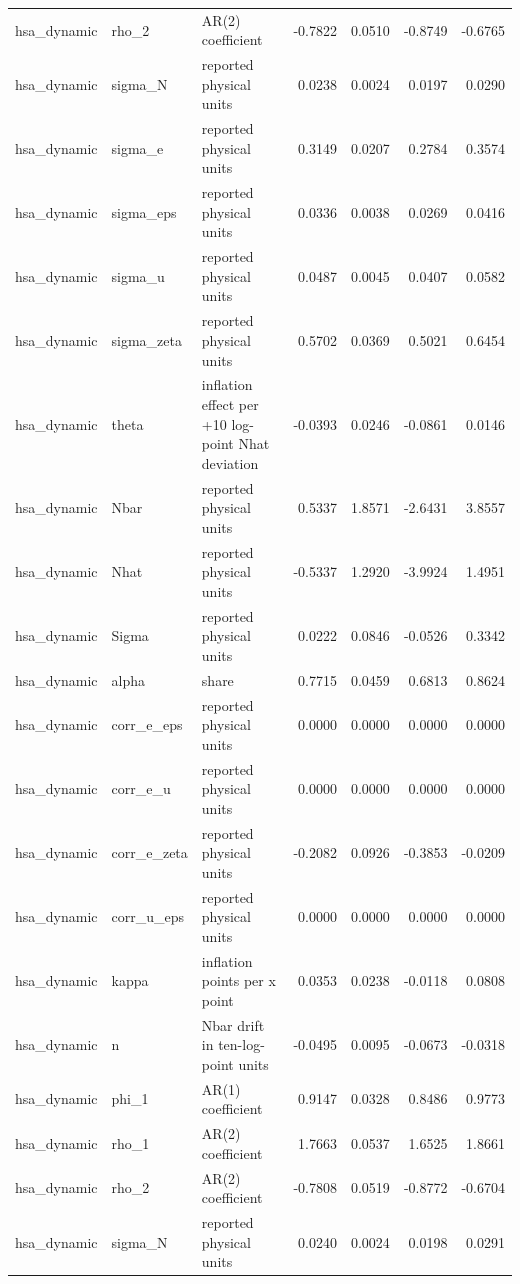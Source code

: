 \begin{tabular}{lllrrrr}
hsa\_dynamic & rho\_2 & AR(2) coefficient & -0.7822 & 0.0510 & -0.8749 & -0.6765 \\
hsa\_dynamic & sigma\_N & reported physical units & 0.0238 & 0.0024 & 0.0197 & 0.0290 \\
hsa\_dynamic & sigma\_e & reported physical units & 0.3149 & 0.0207 & 0.2784 & 0.3574 \\
hsa\_dynamic & sigma\_eps & reported physical units & 0.0336 & 0.0038 & 0.0269 & 0.0416 \\
hsa\_dynamic & sigma\_u & reported physical units & 0.0487 & 0.0045 & 0.0407 & 0.0582 \\
hsa\_dynamic & sigma\_zeta & reported physical units & 0.5702 & 0.0369 & 0.5021 & 0.6454 \\
hsa\_dynamic & theta & inflation effect per +10 log-point Nhat deviation & -0.0393 & 0.0246 & -0.0861 & 0.0146 \\
hsa\_dynamic & Nbar & reported physical units & 0.5337 & 1.8571 & -2.6431 & 3.8557 \\
hsa\_dynamic & Nhat & reported physical units & -0.5337 & 1.2920 & -3.9924 & 1.4951 \\
hsa\_dynamic & Sigma & reported physical units & 0.0222 & 0.0846 & -0.0526 & 0.3342 \\
hsa\_dynamic & alpha & share & 0.7715 & 0.0459 & 0.6813 & 0.8624 \\
hsa\_dynamic & corr\_e\_eps & reported physical units & 0.0000 & 0.0000 & 0.0000 & 0.0000 \\
hsa\_dynamic & corr\_e\_u & reported physical units & 0.0000 & 0.0000 & 0.0000 & 0.0000 \\
hsa\_dynamic & corr\_e\_zeta & reported physical units & -0.2082 & 0.0926 & -0.3853 & -0.0209 \\
hsa\_dynamic & corr\_u\_eps & reported physical units & 0.0000 & 0.0000 & 0.0000 & 0.0000 \\
hsa\_dynamic & kappa & inflation points per x point & 0.0353 & 0.0238 & -0.0118 & 0.0808 \\
hsa\_dynamic & n & Nbar drift in ten-log-point units & -0.0495 & 0.0095 & -0.0673 & -0.0318 \\
hsa\_dynamic & phi\_1 & AR(1) coefficient & 0.9147 & 0.0328 & 0.8486 & 0.9773 \\
hsa\_dynamic & rho\_1 & AR(2) coefficient & 1.7663 & 0.0537 & 1.6525 & 1.8661 \\
hsa\_dynamic & rho\_2 & AR(2) coefficient & -0.7808 & 0.0519 & -0.8772 & -0.6704 \\
hsa\_dynamic & sigma\_N & reported physical units & 0.0240 & 0.0024 & 0.0198 & 0.0291 \\

\end{tabular}
